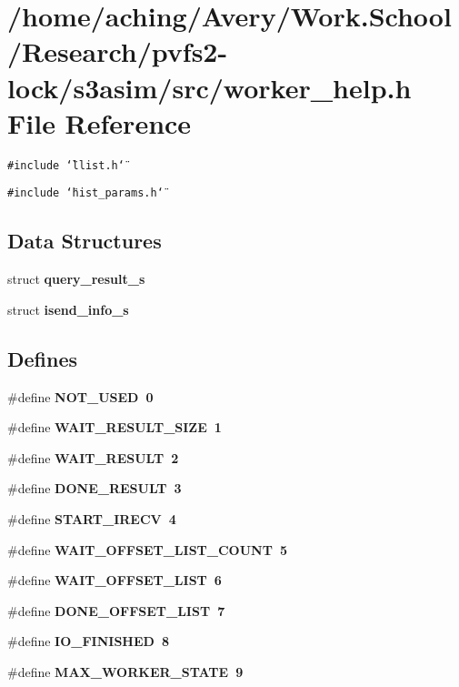 \section{/home/aching/Avery/Work.School/Research/pvfs2-lock/s3asim/src/worker\_\-help.h File Reference}
\label{worker__help_8h}
{\tt \#include \char`\"{}llist.h\char`\"{}}\par
{\tt \#include \char`\"{}hist\_\-params.h\char`\"{}}\par
\subsection*{Data Structures}
\begin{CompactItemize}
\item 
struct \bf{query\_\-result\_\-s}
\item 
struct \bf{isend\_\-info\_\-s}
\end{CompactItemize}
\subsection*{Defines}
\begin{CompactItemize}
\item 
\#define \bf{NOT\_\-USED}~0
\item 
\#define \bf{WAIT\_\-RESULT\_\-SIZE}~1
\item 
\#define \bf{WAIT\_\-RESULT}~2
\item 
\#define \bf{DONE\_\-RESULT}~3
\item 
\#define \bf{START\_\-IRECV}~4
\item 
\#define \bf{WAIT\_\-OFFSET\_\-LIST\_\-COUNT}~5
\item 
\#define \bf{WAIT\_\-OFFSET\_\-LIST}~6
\item 
\#define \bf{DONE\_\-OFFSET\_\-LIST}~7
\item 
\#define \bf{IO\_\-FINISHED}~8
\item 
\#define \bf{MAX\_\-WORKER\_\-STATE}~9
\end{CompactItemize}
